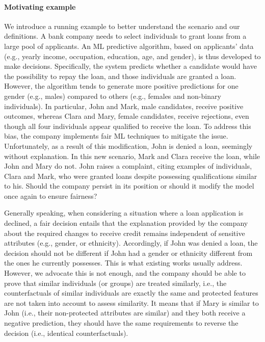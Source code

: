\documentclass[letterpaper]{article} %
\begin{document}
\paragraph{Motivating example}
We introduce a running example to better understand the scenario and our definitions. A bank company needs to select individuals to grant loans from a large pool of applicants. An ML predictive algorithm, based on applicants' data (e.g., yearly income, occupation, education, age, and gender), is thus developed to make decisions. Specifically, the system predicts whether a candidate would have the possibility to repay the loan, and those individuals are granted a loan. However, the algorithm tends to generate more positive predictions for one gender (e.g., males) compared to others (e.g., females and non-binary individuals). In particular, John and Mark, male candidates, receive positive outcomes, whereas Clara and Mary, female candidates, receive rejections, even though all four individuals appear qualified to receive the loan. To address this bias, the company implements fair ML techniques to mitigate the issue. Unfortunately, as a result of this modification, John is denied a loan, seemingly without explanation. In this new scenario, Mark and Clara receive the loan, while John and Mary do not. John raises a complaint, citing examples of individuals, Clara and Mark, who were granted loans despite possessing qualifications similar to his. Should the company persist in its position or should it modify the model once again to ensure fairness?

Generally speaking, when considering a situation where a loan application is declined, a fair decision entails that the explanation provided by the company about the required changes to receive credit remains independent of sensitive attributes (e.g., gender, or ethnicity). 
Accordingly, if John was denied a loan, the decision should not be different if John had a gender or ethnicity different from the ones he currently possesses. This is what existing works usually address.
%
However, we advocate this is not enough, and the company should be able to prove that similar individuals (or groups) are treated similarly, i.e., the counterfactuals of similar individuals are exactly the same and protected features are not taken into account to assess similarity. It means that if Mary is similar to John (i.e., their non-protected attributes are similar) and they both receive a negative prediction, they should have the same requirements to reverse the decision (i.e., identical counterfactuals).
\end{document}
